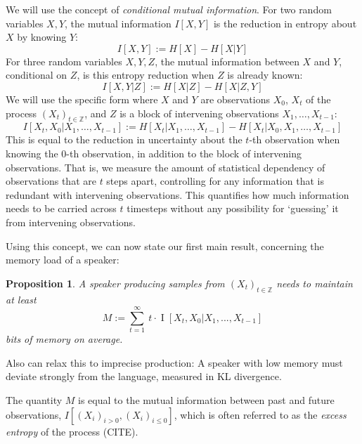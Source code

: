 \documentclass[11pt,letterpaper]{article}
\newcounter{theorem}
\newtheorem{proposition}[theorem]{Proposition}
\begin{document}
We will use the concept of \emph{conditional mutual information}.
For two random variables $X, Y$, the mutual information $I[X,Y]$ is the reduction in entropy about $X$ by knowing $Y$:
\begin{equation}
	I[X,Y] := H[X] - H[X|Y]
\end{equation}
For three random variables $X, Y, Z$, the mutual information between $X$ and $Y$, conditional on $Z$, is this entropy reduction when $Z$ is already known:
\begin{equation}
I[X,Y|Z] := H[X|Z] - H[X|Z,Y]
\end{equation}
We will use the specific form where $X$ and $Y$ are observations $X_0$, $X_t$ of the process $(X_t)_{t \in \mathbb{Z}}$, and $Z$ is a block of intervening observations $X_1, \dots, X_{t-1}$:
\begin{equation}
	I[X_t, X_0 | X_1, \dots, X_{t-1}] := H[X_t| X_1, \dots, X_{t-1}] - H[X_t| X_0, X_1, \dots, X_{t-1}]
\end{equation}
This is equal to the reduction in uncertainty about the $t$-th observation when knowing the $0$-th observation, in addition to the block of intervening observations.
That is, we measure the amount of statistical dependency of observations that are $t$ steps apart, controlling for any information that is redundant with intervening observations.
This quantifies how much information needs to be carried across $t$ timesteps without any possibility for `guessing' it from intervening observations.



Using this concept, we can now state our first main result, concerning the memory load of a speaker: %

\begin{proposition}\label{prop:lower-bound}
	A speaker producing samples from $(X_t)_{t \in \mathbb{Z}}$ needs to maintain at least
\begin{equation}\label{eq:memory-bound}
M := \sum_{t=1}^\infty\ t \cdot \operatorname{I}[X_t, X_0 | X_1, ..., X_{t-1}]
\end{equation}
bits of memory on average.

\end{proposition}


Also can relax this to imprecise production: A speaker with low memory must deviate strongly from the language, measured in KL divergence.

The quantity $M$ is equal to the mutual information between past and future observations, $I[(X_i)_{i>0}, (X_i)_{i \leq 0}]$, which is often referred to as the \emph{excess entropy} of the process (CITE).
\end{document}
